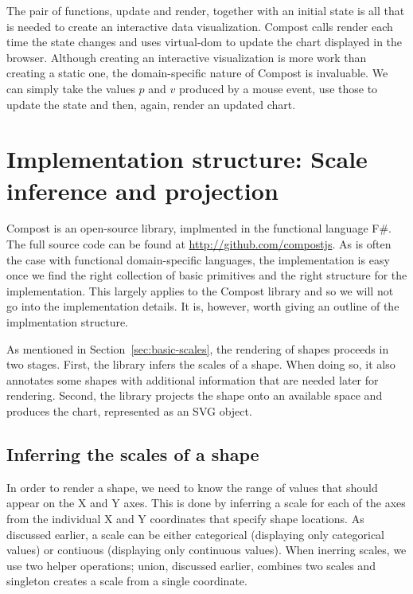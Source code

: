 \documentclass{jfp}
\newcommand{\ident}[1]{\textnormal{\textcolor{idclr}{\sffamily #1}}}
\newcommand{\urrl}[1]{\textnormal{\textcolor{urlclr}{\url{#1}}}}
\begin{document}
The pair of functions, \ident{update} and \ident{render}, together with an initial state is
all that is needed to create an interactive data visualization. Compost calls
\ident{render} each time the state changes and uses virtual-dom to update the chart
displayed in the browser. Although creating an interactive visualization is more work than
creating a static one, the domain-specific nature of Compost is invaluable. We can
simply take the values $p$ and $v$ produced by a mouse event, use those to update the state
and then, again, render an updated chart.


\section{Implementation structure: Scale inference and projection}
\label{sec:impl}

Compost is an open-source library, implmented in the functional language F\#. The full source
code can be found at \urrl{http://github.com/compostjs}.
As is often the case with functional domain-specific languages, the implementation is easy once
we find the right collection of basic primitives and the right structure for the implementation.
This largely applies to the Compost library and so we will not go into the implementation details.
It is, however, worth giving an outline of the implmentation structure.

As mentioned in Section~\ref{sec:basic-scales}, the rendering of shapes proceeds in two stages.
First, the library infers the scales of a shape. When doing so, it also annotates some shapes
with additional information that are needed later for rendering. Second, the library projects
the shape onto an available space and produces the chart, represented as an SVG object.

\subsection{Inferring the scales of a shape}

In order to render a shape, we need to know the range of values that should appear on the X and
Y axes. This is done by inferring a scale for each of the axes from the individual X and Y
coordinates that specify shape locations. As discussed earlier, a scale can be either categorical
(displaying only categorical values) or contiuous (displaying only continuous values). When
inerring scales, we use two helper operations; \ident{union}, discussed earlier, combines two
scales and \ident{singleton} creates a scale from a single coordinate.
\end{document}
